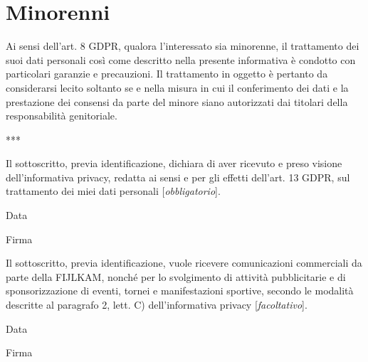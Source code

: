 \documentclass[
	twocolumn
]{djts}
\begin{document}
	\section*{Minorenni}
	Ai sensi dell'art. 8 GDPR, qualora l'interessato sia minorenne, il trattamento dei suoi dati personali così come descritto nella presente informativa è condotto con particolari garanzie e precauzioni. Il trattamento in oggetto è pertanto da considerarsi lecito soltanto se e nella misura in cui il conferimento dei dati e la prestazione dei consensi da parte del minore siano autorizzati dai titolari della responsabilità genitoriale.
	
	\begin{center}
		\vspace{0.05in}
		***
		\vspace{0.05in}
	\end{center}
	
	\fontsize{10pt}{11pt}\selectfont
	
	Il sottoscritto, previa identificazione, dichiara di aver ricevuto e preso visione dell'informativa privacy, redatta ai sensi e per gli effetti dell'art. 13 GDPR, sul trattamento dei miei dati personali [\textit{obbligatorio}].
	\begin{center}
		\begin{minipage}{0.4\linewidth}
			\centering
			Data \\[5pt]
		\end{minipage}
		\begin{minipage}{0.4\linewidth}
			\centering
			Firma \\[5pt]
		\end{minipage}
	\end{center}
	\vspace{0.1in}
	
	Il sottoscritto, previa identificazione, vuole ricevere comunicazioni commerciali da parte della FIJLKAM, nonché per lo svolgimento di attività pubblicitarie e di sponsorizzazione di eventi, tornei e manifestazioni sportive, secondo le modalità descritte al paragrafo 2, lett. C) dell'informativa privacy [\textit{facoltativo}].
	\begin{center}
		\begin{minipage}{0.4\linewidth}
			\centering
			Data \\[5pt]
		\end{minipage}
		\begin{minipage}{0.4\linewidth}
			\centering
			Firma \\[5pt]
		\end{minipage}
	\end{center}
	\vspace{0.1in}
	
\end{document}
